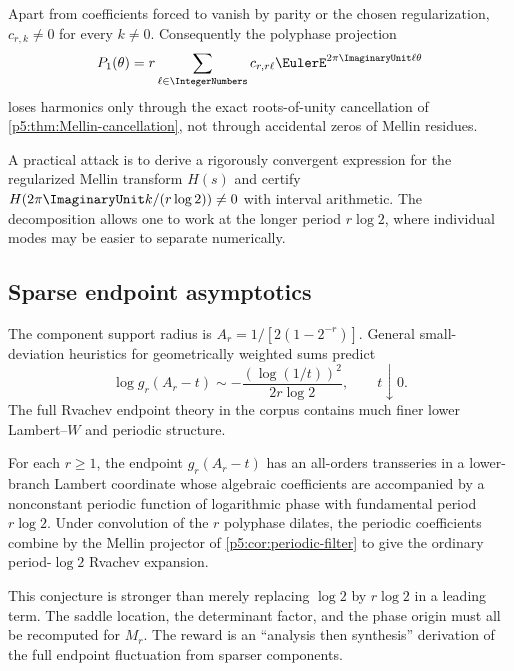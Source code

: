 \documentclass[11pt]{article}
\theoremstyle{definition}
\theoremstyle{remark}
\begin{document}
\begin{conjecture}
\label{p5:conj:Mellin-nondegenerate}
Apart from coefficients forced to vanish by parity or the chosen
regularization, $c_{r,k}\ne0$ for every $k\ne0$.  Consequently the polyphase
projection
\begin{equation}
 P_1(\theta)=r\sum_{\ell\in\IntegerNumbers}c_{r,r\ell}\EulerE^{2\pi\ImaginaryUnit\ell\theta} \label{p5:eq:Pr-projection-conj}
\end{equation}
loses harmonics only through the exact roots-of-unity cancellation of
\cref{p5:thm:Mellin-cancellation}, not through accidental zeros of Mellin residues.
\end{conjecture}

A practical attack is to derive a rigorously convergent expression for the
regularized Mellin transform $H(s)$ and certify $H(2\pi\ImaginaryUnit k/(r\log2))\ne0$
with interval arithmetic.  The decomposition allows one to work at the longer
period $r\log2$, where individual modes may be easier to separate numerically.

\subsection{Sparse endpoint asymptotics}

The component support radius is $A_r=1/[2(1-2^{-r})]$.  General small-deviation
heuristics for geometrically weighted sums predict
\begin{equation}
 \log g_r(A_r-t)
 \sim-\frac{(\log(1/t))^2}{2r\log2},
 \qquad t\downarrow0.                                    \label{p5:eq:sparse-leading-endpoint}
\end{equation}
The full Rvachev endpoint theory in the corpus contains much finer lower
Lambert--$W$ and periodic structure.

\begin{conjecture}
\label{p5:conj:sparse-Lambert}
For each $r\ge1$, the endpoint $g_r(A_r-t)$ has an all-orders transseries in a
lower-branch Lambert coordinate whose algebraic coefficients are accompanied
by a nonconstant periodic function of logarithmic phase with fundamental
period $r\log2$.  Under convolution of the $r$ polyphase dilates, the periodic
coefficients combine by the Mellin projector of
\cref{p5:cor:periodic-filter} to give the ordinary period-$\log2$ Rvachev
expansion.
\end{conjecture}

This conjecture is stronger than merely replacing $\log2$ by $r\log2$ in a leading term.  The saddle location, the determinant
factor, and the phase origin must all be recomputed for $M_r$.  The reward is an
``analysis then synthesis'' derivation of the full endpoint fluctuation from
sparser components.
\end{document}
